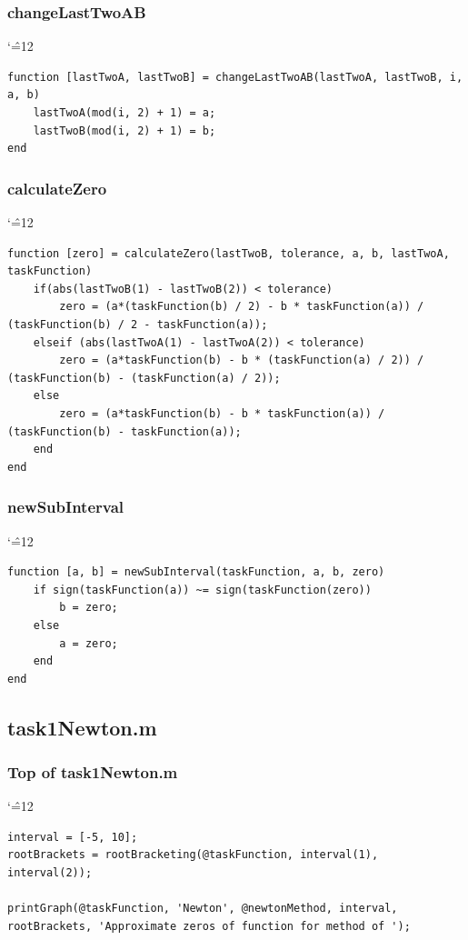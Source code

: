 \documentclass[12pt]{report}
\newenvironment{simplechar}{%
   \catcode`\^=12
}{}
\begin{document}
\subsubsection{changeLastTwoAB}
\begin{simplechar}
\begin{lstlisting}
function [lastTwoA, lastTwoB] = changeLastTwoAB(lastTwoA, lastTwoB, i, a, b)
    lastTwoA(mod(i, 2) + 1) = a;
    lastTwoB(mod(i, 2) + 1) = b;
end
\end{lstlisting}
\end{simplechar}

\newpage
\subsubsection{calculateZero}
\begin{simplechar}
\begin{lstlisting}
function [zero] = calculateZero(lastTwoB, tolerance, a, b, lastTwoA, taskFunction)
    if(abs(lastTwoB(1) - lastTwoB(2)) < tolerance)
        zero = (a*(taskFunction(b) / 2) - b * taskFunction(a)) / (taskFunction(b) / 2 - taskFunction(a));
    elseif (abs(lastTwoA(1) - lastTwoA(2)) < tolerance)
        zero = (a*taskFunction(b) - b * (taskFunction(a) / 2)) / (taskFunction(b) - (taskFunction(a) / 2));
    else
        zero = (a*taskFunction(b) - b * taskFunction(a)) / (taskFunction(b) - taskFunction(a));
    end
end
\end{lstlisting}
\end{simplechar}

\subsubsection{newSubInterval}
\begin{simplechar}
\begin{lstlisting}
function [a, b] = newSubInterval(taskFunction, a, b, zero)
    if sign(taskFunction(a)) ~= sign(taskFunction(zero))
        b = zero;
    else
        a = zero;
    end
end

\end{lstlisting}
\end{simplechar}



\subsection{task1Newton.m}

\subsubsection{Top of task1Newton.m}
\begin{simplechar}
\begin{lstlisting}
interval = [-5, 10];
rootBrackets = rootBracketing(@taskFunction, interval(1), interval(2));

printGraph(@taskFunction, 'Newton', @newtonMethod, interval, rootBrackets, 'Approximate zeros of function for method of ');
\end{lstlisting}
\end{simplechar}
\end{document}
